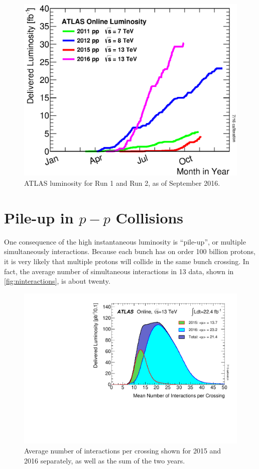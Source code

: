 \begin{centering}
\begin{figure}[!hbt]
\myfloatalign
\includegraphics[width=.90\linewidth]{figures/lhc/intlumivsyear.eps}
\caption{ATLAS luminosity for Run 1 and Run 2, as of September 2016.}
\label{fig:lumi_vs_year}
\end{figure}
\end{centering}

\section{Pile-up in $p-p$ Collisions}

One consequence of the high instantaneous luminosity is ``pile-up'', or multiple simultaneously interactions. Because each bunch has on order 100 billion protons, it is very likely that multiple protons will collide in the same bunch crossing. In fact, the average number of simultaneous interactions in 13 \tev data, shown in \autoref{fig:ninteractions}, is about twenty. 

\begin{centering}
\begin{figure}[!hbt]
\myfloatalign
\includegraphics[width=.85\linewidth]{figures/atlas/mu_2015_2016_ICHEP.pdf}
\caption{Average number of interactions per crossing shown for 2015 and 2016 separately, as well as the sum of the two years.}
\label{fig:ninteractions}
\end{figure}
\end{centering}

